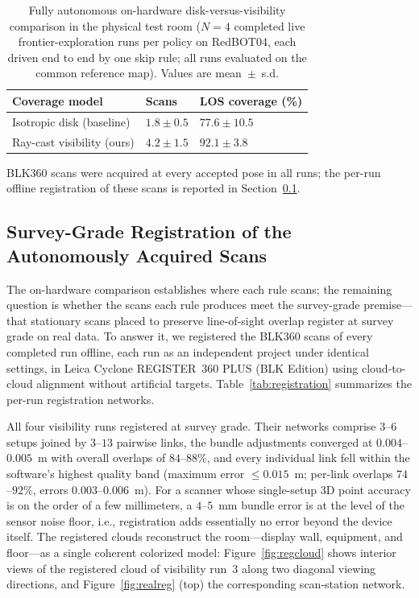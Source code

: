\documentclass[sensors,article,submit,pdftex,moreauthors]{Definitions/mdpi}
\begin{document}
\begin{table}[H]
\caption{Fully autonomous on-hardware disk-versus-visibility comparison in the
physical test room ($N=4$ completed live frontier-exploration runs per policy on
RedBOT04, each driven end to end by one skip rule; all runs evaluated on the
common reference map). Values are mean~$\pm$~s.d.}
\label{tab:fieldsim}
\begin{tabularx}{\linewidth}{l Z Z}
\toprule
\textbf{Coverage model} & \textbf{Scans} & \textbf{LOS coverage (\%)} \\
\midrule
Isotropic disk (baseline)   & $1.8\pm0.5$ & $77.6\pm10.5$ \\
Ray-cast visibility (ours)  & $4.2\pm1.5$ & $\mathbf{92.1\pm3.8}$ \\
\bottomrule
\end{tabularx}
\noindent\footnotesize{BLK360 scans were acquired at every accepted pose in all
runs; the per-run offline registration of these scans is reported in
Section~\ref{sec:realhw}.}
\end{table}

\subsection{Survey-Grade Registration of the Autonomously Acquired Scans}
\label{sec:realhw}

The on-hardware comparison establishes where each rule scans; the remaining
question is whether the scans each rule produces meet the survey-grade
premise---that stationary scans placed to preserve line-of-sight overlap
register at survey grade on real data. To answer it, we registered the BLK360
scans of every completed run offline, each run as an independent project under
identical settings, in Leica Cyclone REGISTER~360 PLUS (BLK Edition) using
cloud-to-cloud alignment without artificial targets.
Table~\ref{tab:registration} summarizes the per-run registration networks.

All four visibility runs registered at survey grade. Their networks comprise
$3$--$6$ setups joined by $3$--$13$ pairwise links, the bundle adjustments
converged at $0.004$--$0.005$~m with overall overlaps of $84$--$88\%$, and every
individual link fell within the software's highest quality band (maximum error
$\le 0.015$~m; per-link overlaps $74$--$92\%$, errors $0.003$--$0.006$~m). For a
scanner whose single-setup 3D point accuracy is on the order of a few
millimeters, a $4$--$5$~mm bundle error is at the level of the sensor noise
floor, i.e., registration adds essentially no error beyond the device itself.
The registered clouds reconstruct the room---display wall, equipment, and
floor---as a single coherent colorized model: Figure~\ref{fig:regcloud} shows
interior views of the registered cloud of visibility run~3 along two diagonal
viewing directions, and Figure~\ref{fig:realreg} (top) the corresponding
scan-station network.
\end{document}
